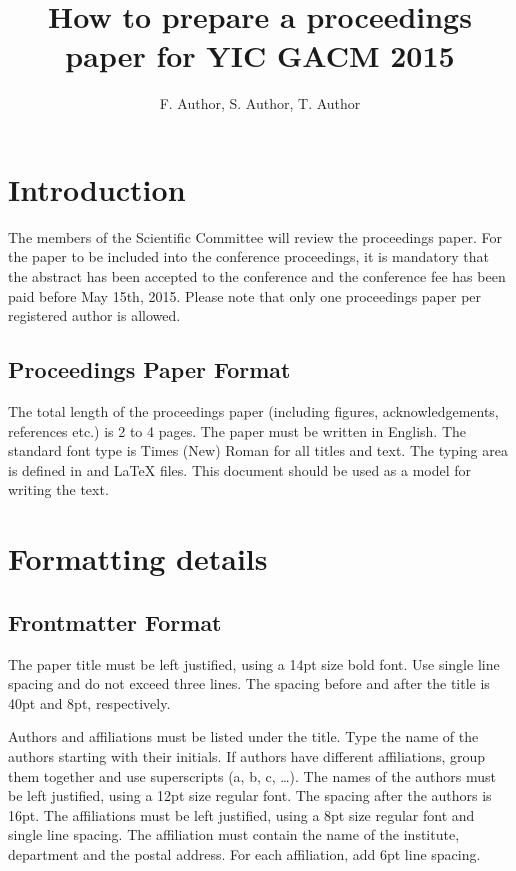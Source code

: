 \documentclass[]{YIC2015}
\title{How to prepare a proceedings paper for YIC GACM 2015}
\author[F. Author et al.]{F. Author\authref{a}\corref, S. Author\authref{a}, T.
Author\authref{b} }
\begin{document}
\maketitle

\section{Introduction}
%
The members of the Scientific Committee will review the proceedings paper. For the paper to be included into the conference proceedings, it is mandatory that the abstract has been accepted to the conference and the conference fee has been paid before May 15th, 2015. Please note that only one proceedings paper per registered author is allowed.

\subsection{Proceedings Paper Format}
The total length of the proceedings paper (including figures, acknowledgements, references etc.) is 2 to 4 pages. The paper must be written in English.
The standard font type is Times (New) Roman for all titles and text.
The typing area is defined in %
and LaTeX files. %
This document should be used as a model for writing the text.

\section{Formatting details}

\subsection{Frontmatter Format}

The paper title must be left justified, using a 14pt size bold font. Use single line spacing and do not exceed three lines. The spacing before and after the title is 40pt and 8pt, respectively.

Authors and affiliations must be listed under the title. Type the name of the authors starting with their initials. If authors have different affiliations, group them together and use superscripts (a, b, c, \ldots). The names of the authors must be left justified, using a 12pt size regular font. The spacing after the authors is 16pt.
The affiliations must be left justified, using a 8pt size regular font and single line spacing. The affiliation must contain the name of the institute, department and the postal address. For each affiliation, add 6pt line spacing.
\end{document}
